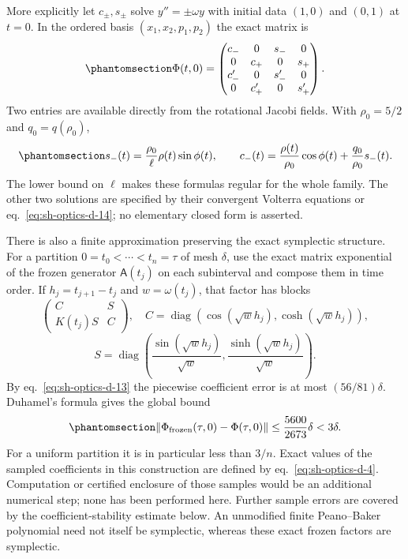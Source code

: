 \documentclass[
  english,
  11pt,
  reqno]{amsart}
\newcounter{none} %
\begin{document}
More explicitly let \(c_\pm,s_\pm\) solve \(y''=\pm\omega y\) with
initial data \((1,0)\) and \((0,1)\) at \(t=0\). In the ordered basis
\((x_1,x_2,p_1,p_2)\) the exact matrix is
\begin{equation}\protect\phantomsection\label{eq:sh-optics-d-16}{
 \Phi(t,0)=
 \begin{pmatrix}
 c_-&0&s_-&0\\
 0&c_+&0&s_+\\
 c_-'&0&s_-'&0\\
 0&c_+'&0&s_+'
 \end{pmatrix}.
}\end{equation} Two entries are available directly from the rotational
Jacobi fields. With \(\rho_0=5/2\) and \(q_0=q(\rho_0)\),
\begin{equation}\protect\phantomsection\label{eq:sh-optics-d-17}{
 s_-(t)=\frac{\rho_0}{\ell}\rho(t)\sin\phi(t),\qquad
 c_-(t)=\frac{\rho(t)}{\rho_0}\cos\phi(t)
                 +\frac{q_0}{\rho_0}s_-(t).
}\end{equation} The lower bound on \(\ell\) makes these formulas regular
for the whole family. The other two solutions are specified by their
convergent Volterra equations or eq.~\ref{eq:sh-optics-d-14}; no
elementary closed form is asserted.

There is also a finite approximation preserving the exact symplectic
structure. For a partition \(0=t_0<\cdots<t_n=\tau\) of mesh \(\delta\),
use the exact matrix exponential of the frozen generator
\(\mathsf A(t_j)\) on each subinterval and compose them in time order.
If \(h_j=t_{j+1}-t_j\) and \(w=\omega(t_j)\), that factor has blocks \[
 \begin{pmatrix}C&S\\K(t_j)S&C\end{pmatrix},\quad
 C=\operatorname{diag}(\cos(\sqrt w h_j),\cosh(\sqrt w h_j)),
\] \[
 S=\operatorname{diag}\left(
 \frac{\sin(\sqrt w h_j)}{\sqrt w},
 \frac{\sinh(\sqrt w h_j)}{\sqrt w}\right).
\] By eq.~\ref{eq:sh-optics-d-13} the piecewise coefficient error is at
most \((56/81)\delta\). Duhamel's formula gives the global bound
\begin{equation}\protect\phantomsection\label{eq:sh-optics-d-18}{
 \|\Phi_{\mathrm{frozen}}(\tau,0)-\Phi(\tau,0)\|
 \le\frac{5600}{2673}\delta<3\delta.
}\end{equation} For a uniform partition it is in particular less than
\(3/n\). Exact values of the sampled coefficients in this construction
are defined by eq.~\ref{eq:sh-optics-d-4}. Computation or certified
enclosure of those samples would be an additional numerical step; none
has been performed here. Further sample errors are covered by the
coefficient-stability estimate below. An unmodified finite Peano--Baker
polynomial need not itself be symplectic, whereas these exact frozen
factors are symplectic.
\end{document}
